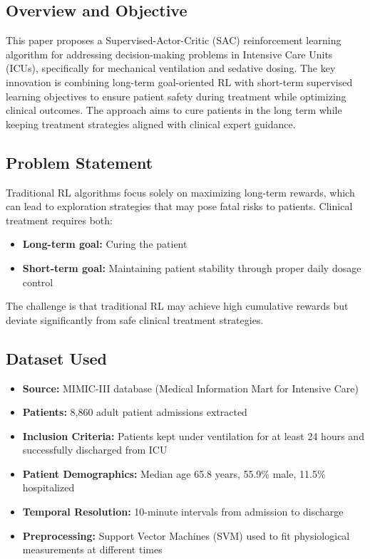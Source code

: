 \subsection*{Overview and Objective}
This paper proposes a Supervised-Actor-Critic (SAC) reinforcement learning algorithm for addressing decision-making problems in Intensive Care Units (ICUs), specifically for mechanical ventilation and sedative dosing. The key innovation is combining long-term goal-oriented RL with short-term supervised learning objectives to ensure patient safety during treatment while optimizing clinical outcomes. The approach aims to cure patients in the long term while keeping treatment strategies aligned with clinical expert guidance.

\subsection*{Problem Statement}
Traditional RL algorithms focus solely on maximizing long-term rewards, which can lead to exploration strategies that may pose fatal risks to patients. Clinical treatment requires both:
\begin{itemize}
    \item \textbf{Long-term goal:} Curing the patient
    \item \textbf{Short-term goal:} Maintaining patient stability through proper daily dosage control
\end{itemize}
The challenge is that traditional RL may achieve high cumulative rewards but deviate significantly from safe clinical treatment strategies.

\subsection*{Dataset Used}
\begin{itemize}
    \item \textbf{Source:} MIMIC-III database (Medical Information Mart for Intensive Care)
    \item \textbf{Patients:} 8,860 adult patient admissions extracted
    \item \textbf{Inclusion Criteria:} Patients kept under ventilation for at least 24 hours and successfully discharged from ICU
    \item \textbf{Patient Demographics:} Median age 65.8 years, 55.9\% male, 11.5\% hospitalized
    \item \textbf{Temporal Resolution:} 10-minute intervals from admission to discharge
    \item \textbf{Preprocessing:} Support Vector Machines (SVM) used to fit physiological measurements at different times
\end{itemize}

